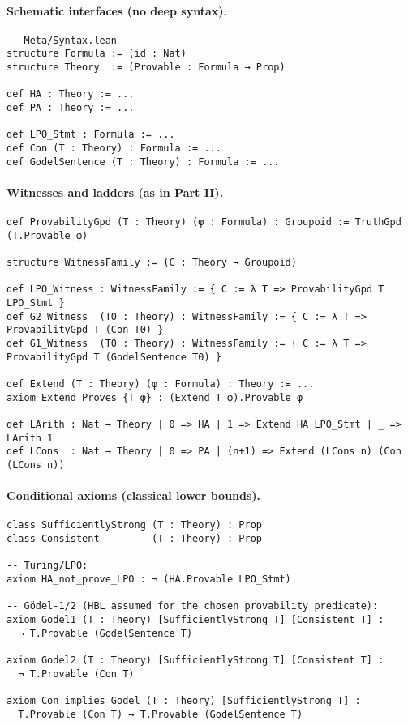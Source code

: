 \documentclass[11pt]{article}
\theoremstyle{definition}
\theoremstyle{remark}
\begin{document}
\paragraph{Schematic interfaces (no deep syntax).}
\begin{verbatim}
-- Meta/Syntax.lean
structure Formula := (id : Nat)
structure Theory  := (Provable : Formula → Prop)

def HA : Theory := ...
def PA : Theory := ...

def LPO_Stmt : Formula := ...
def Con (T : Theory) : Formula := ...
def GodelSentence (T : Theory) : Formula := ...
\end{verbatim}

\paragraph{Witnesses and ladders (as in Part II).}
\begin{verbatim}
def ProvabilityGpd (T : Theory) (φ : Formula) : Groupoid := TruthGpd (T.Provable φ)

structure WitnessFamily := (C : Theory → Groupoid)

def LPO_Witness : WitnessFamily := { C := λ T => ProvabilityGpd T LPO_Stmt }
def G2_Witness  (T0 : Theory) : WitnessFamily := { C := λ T => ProvabilityGpd T (Con T0) }
def G1_Witness  (T0 : Theory) : WitnessFamily := { C := λ T => ProvabilityGpd T (GodelSentence T0) }

def Extend (T : Theory) (φ : Formula) : Theory := ...
axiom Extend_Proves {T φ} : (Extend T φ).Provable φ

def LArith : Nat → Theory | 0 => HA | 1 => Extend HA LPO_Stmt | _ => LArith 1
def LCons  : Nat → Theory | 0 => PA | (n+1) => Extend (LCons n) (Con (LCons n))
\end{verbatim}

\paragraph{Conditional axioms (classical lower bounds).}
\begin{verbatim}
class SufficientlyStrong (T : Theory) : Prop
class Consistent         (T : Theory) : Prop

-- Turing/LPO:
axiom HA_not_prove_LPO : ¬ (HA.Provable LPO_Stmt)

-- Gödel-1/2 (HBL assumed for the chosen provability predicate):
axiom Godel1 (T : Theory) [SufficientlyStrong T] [Consistent T] :
  ¬ T.Provable (GodelSentence T)

axiom Godel2 (T : Theory) [SufficientlyStrong T] [Consistent T] :
  ¬ T.Provable (Con T)

axiom Con_implies_Godel (T : Theory) [SufficientlyStrong T] :
  T.Provable (Con T) → T.Provable (GodelSentence T)
\end{verbatim}
\end{document}

